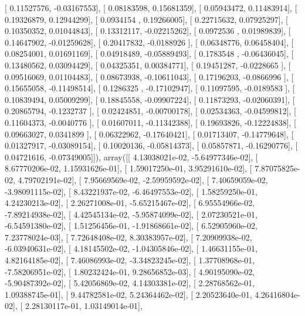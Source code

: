 \documentclass{article}
\begin{document}
       [ 0.11527576, -0.03167553],
       [ 0.08183598,  0.15681359],
       [ 0.05943472,  0.11483914],
       [ 0.19326879,  0.12944299],
       [ 0.0934154 ,  0.19266005],
       [ 0.22715632,  0.07925297],
       [ 0.10350352,  0.01044843],
       [ 0.13312117, -0.02215262],
       [ 0.0972536 ,  0.01989839],
       [ 0.14647902, -0.01259628],
       [ 0.20417832, -0.0188926 ],
       [ 0.06348776,  0.06458404],
       [ 0.08254001,  0.01691169],
       [ 0.04918489, -0.05889493],
       [ 0.1783548 , -0.06436045],
       [ 0.13480562,  0.03094429],
       [ 0.04325351,  0.00384771],
       [ 0.19451287, -0.0228665 ],
       [ 0.09516069,  0.01104483],
       [ 0.08673938, -0.10611043],
       [ 0.17196203, -0.0866996 ],
       [ 0.15655058, -0.11498514],
       [ 0.1286325 , -0.17102947],
       [ 0.11097595, -0.0189583 ],
       [ 0.10839494,  0.05009299],
       [ 0.18845558, -0.09907224],
       [ 0.11873293, -0.02060391],
       [ 0.20865794, -0.1232737 ],
       [ 0.02424851, -0.00700178],
       [ 0.02534363, -0.04599812],
       [ 0.11604373, -0.0040776 ],
       [ 0.01607011, -0.11342388],
       [ 0.19693826, -0.12224838],
       [ 0.09663027,  0.0341899 ],
       [ 0.06322962, -0.17640421],
       [ 0.01713407, -0.14779648],
       [ 0.01327917, -0.03089154],
       [ 0.10020136, -0.05814373],
       [ 0.05857871, -0.16290776],
       [ 0.04721616, -0.07349005]]), array([[  4.13038021e-02,  -5.64977346e-02],
       [  8.67770206e-02,   1.15931626e-01],
       [  1.59017250e-01,   3.95291610e-02],
       [  7.87075825e-02,   4.79702191e-02],
       [  7.95669569e-02,  -2.59959592e-02],
       [  7.40659059e-02,  -3.98091115e-02],
       [  8.43221937e-02,  -6.46497553e-02],
       [  1.58259250e-01,   4.24230213e-02],
       [  2.26271008e-01,  -5.65215467e-02],
       [  6.95554966e-02,  -7.89214938e-02],
       [  4.42545134e-02,  -5.95874099e-02],
       [  2.07230521e-01,  -6.54591380e-02],
       [  1.51256456e-01,  -1.91868661e-02],
       [  6.52905960e-02,   7.23778024e-03],
       [  7.72648408e-02,   8.30383957e-02],
       [  7.20909938e-02,  -6.03940631e-02],
       [  4.18145502e-02,  -1.04305846e-02],
       [  1.46631155e-01,   4.82164185e-02],
       [  7.46086993e-02,  -3.34823245e-02],
       [  1.37708968e-01,  -7.58206951e-02],
       [  1.80232424e-01,   9.28656852e-03],
       [  4.90195090e-02,  -5.90487392e-02],
       [  5.42056869e-02,   4.14303381e-02],
       [  2.28768562e-01,   1.09388745e-01],
       [  9.44782581e-02,   5.24364462e-02],
       [  2.20523640e-01,   4.26416804e-02],
       [  2.28130117e-01,   1.03149014e-01],
\end{document}
